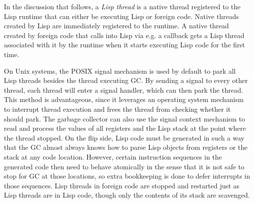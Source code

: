 \documentclass[format=sigconf]{acmart}
\begin{document}
In the discussion that follows, a \textit{Lisp thread} is a native thread registered to the Lisp runtime that can either be executing Lisp or foreign code. Native threads created by Lisp are immediately registered to the runtime. A native thread created by foreign code that calls into Lisp via e.g. a callback gets a Lisp thread associated with it by the runtime when it starts executing Lisp code for the first time.

On Unix systems, the POSIX signal mechanism is used by default to park all Lisp threads besides the thread executing GC. By sending a signal to every other thread, each thread will enter a signal handler, which can then park the thread. This method is advantageous, since it leverages an operating system mechanism to interrupt thread execution and frees the thread from checking whether it should park. The garbage collector can also use the signal context mechanism to read and process the values of all registers and the Lisp stack at the point where the thread stopped. On the flip side, Lisp code must be generated in such a way that the GC almost always knows how to parse Lisp objects from registers or the stack at any code location. However, certain instruction sequences in the generated code then need to behave atomically in the sense that it is not safe to stop for GC at those locations, so extra bookkeeping is done to defer interrupts in those sequences. Lisp threads in foreign code are stopped and restarted just as Lisp threads are in Lisp code, though only the contents of its stack are scavenged.
\end{document}
